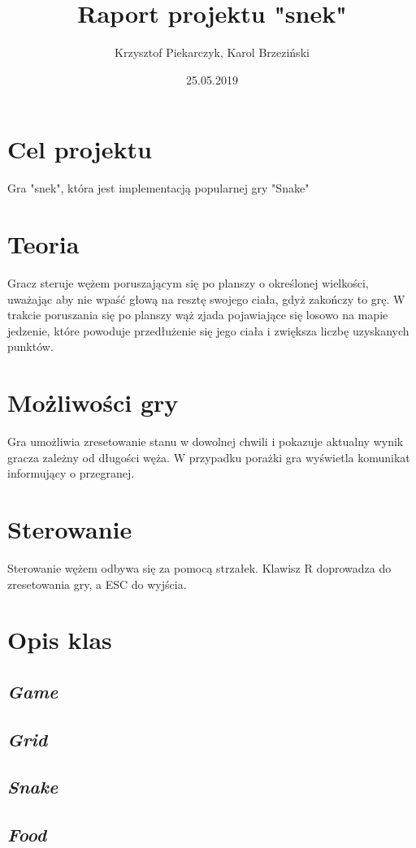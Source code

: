 \documentclass[12pt]{article}
\title{Raport projektu "snek"}
\author{Krzysztof Piekarczyk, Karol Brzeziński}
\date{25.05.2019}
\begin{document}
\maketitle


\section{Cel projektu}

Gra "snek", która jest implementacją popularnej gry "Snake"

\section{Teoria}

Gracz steruje wężem poruszającym się po planszy o określonej wielkości, uważając aby nie wpaść głową na resztę swojego ciała, gdyż zakończy to grę. W trakcie poruszania się po planszy wąż zjada pojawiające się losowo na mapie jedzenie, które powoduje przedłużenie się jego ciała i zwiększa liczbę uzyskanych punktów.

\section{Możliwości gry}

Gra umożliwia zresetowanie stanu w dowolnej chwili i pokazuje aktualny wynik gracza zależny od długości węża. W przypadku porażki gra wyświetla komunikat informujący o przegranej.

\section{Sterowanie}

Sterowanie wężem odbywa się za pomocą strzałek. Klawisz R doprowadza do zresetowania gry, a ESC do wyjścia.

\section{Opis klas}

\subsection{\textbf{\textit{Game}}}

\subsection{\textbf{\textit{Grid}}}

\subsection{\textbf{\textit{Snake}}}

\subsection{\textbf{\textit{Food}}}
\end{document}

